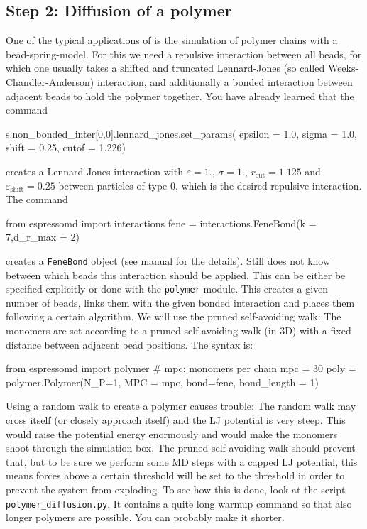 \subsection{Step 2: Diffusion of a polymer}
One of the typical applications of \ES{} is the simulation of polymer chains 
with a bead-spring-model. For this we need a repulsive interaction
between all beads, for which one usually takes a shifted and truncated
Lennard-Jones (so called Weeks-Chandler-Anderson) interaction, 
and additionally a bonded interaction between 
adjacent beads to hold the polymer together. You have already learned
that the command
{\vspace{0,2cm}\small
\begin{pypresso}
  s.non\_bonded\_inter[0,0].lennard\_jones.set\_params(
      epsilon = 1.0, sigma = 1.0,
      shift = 0.25, cutof = 1.226)
\end{pypresso}\vspace{0,2cm}
}
creates a Lennard-Jones interaction with $\varepsilon=1.$, $\sigma=1.$,
$r_\text{cut} = 1.125$ and $\varepsilon_\text{shift}=0.25$ between particles
of type 0, which is the desired 
repulsive interaction. The command
{\vspace{0,2cm}\small
\begin{pypresso}
  from espressomd import interactions
  fene = interactions.FeneBond(k = 7,d\_r\_max = 2)
\end{pypresso}
\vspace{0,2cm}
}
creates a \texttt{FeneBond} object (see \ES{} manual for the details). Still \ES{}
does not know between which beads this interaction should be applied.
This can be either be specified explicitly or done with the \texttt{polymer}
module. This creates a given number of beads, links them with the given
bonded interaction and places them following a certain algorithm. We will
use the pruned self-avoiding walk: The monomers are set according 
to a pruned self-avoiding walk (in 3D) with a
fixed distance between adjacent bead positions. The syntax is:
{\vspace{0,2cm}\small
\begin{pypresso}
  from espressomd import polymer
  # mpc: monomers per chain
  mpc = 30
  poly = polymer.Polymer(N_P=1, MPC = mpc, bond=fene, bond_length = 1)
\end{pypresso}
\vspace{0,2cm}
}
Using a random walk to create a polymer causes trouble: The random walk may 
cross itself (or closely approach itself) and the LJ potential is very
steep. This would raise the potential energy enormously and would make
the monomers shoot through the simulation box. The pruned self-avoiding
walk should prevent that, but to be sure
we perform some MD steps with a capped LJ potential, this means 
forces above a certain threshold will be set to the threshold in order to prevent
the system from exploding. To see how this is done, look at the script 
\texttt{polymer\_diffusion.py}.
It contains a quite long warmup command so that also longer polymers
are possible. You can probably make it shorter.

